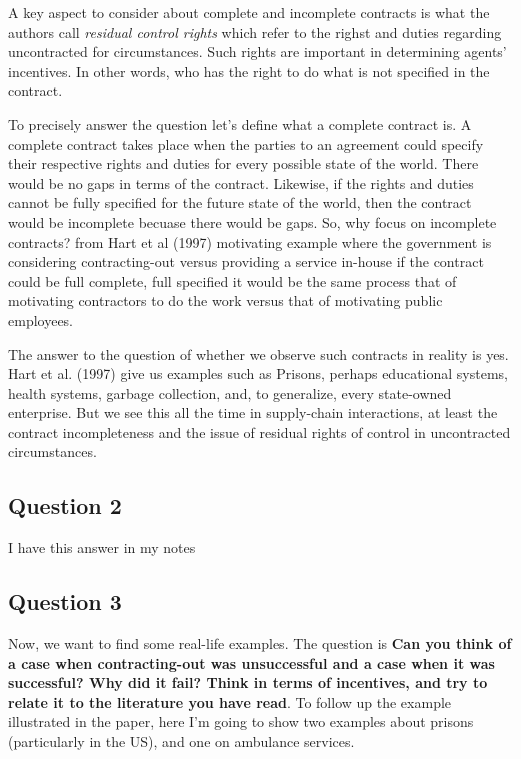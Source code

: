 \documentclass[11pt]{article} %
\begin{document}
A key aspect to consider about complete and incomplete contracts is what the authors call \textit{residual control rights} which refer to the righst and duties regarding uncontracted for circumstances. Such rights are important in determining agents' incentives. In other words, who has the right to do what is not specified in the contract.

To precisely answer the question let's define what a complete contract is. A complete contract takes place when the parties to an agreement could specify their respective rights and duties for every possible state of the world. There would be no gaps in terms of the contract. Likewise, if the rights and duties cannot be fully specified for the future state of the world, then the contract would be incomplete becuase there would be gaps.  So, why focus on incomplete contracts? from Hart et al (1997) motivating example where the government is considering contracting-out versus providing a service in-house if the contract could be full complete, full specified it would be the same process that of motivating contractors to do the work versus that of motivating public employees.

The answer to the question of whether we observe such contracts in reality is yes. Hart et al. (1997) give us examples such as Prisons, perhaps educational systems, health systems, garbage collection, and, to generalize, every state-owned enterprise. But we see this all the time in supply-chain interactions, at least the contract incompleteness and the issue of residual rights of control in uncontracted circumstances.


\subsection{Question 2}

I have this answer in my notes


\subsection{Question 3}
Now, we want to find some real-life examples. The question is \textbf{Can you think of a case when contracting-out was unsuccessful and a case when it was successful? Why did it fail? Think in terms of incentives, and try to relate it to the literature you have read}.  
To follow up the example illustrated in the paper, here I'm going to show two examples about prisons (particularly in the US), and one on ambulance services.
\end{document}
